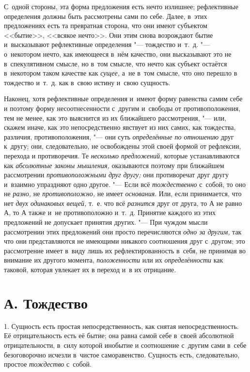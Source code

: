 С~одной стороны, эта форма предложения есть нечто излишнее; рефлективные
определения должны быть рассмотрены сами по себе. Далее, в~этих
предложениях есть та превратная сторона, что они имеют субъектом <<бытие>>,
<<всякое нечто>>. Они этим снова возрождают бытие и~высказывают рефлективные
определения "--- тождество и~т.~д. "--- о~некотором нечто, как имеющееся в~нём
качество, они высказывают это не в~спекулятивном смысле, но в~том смысле,
что нечто как субъект остаётся в~некотором таком качестве как
{\em сущее,} а~не в~том смысле, что оно перешло в
тождество и~т.~д. как в~свою истину и~свою сущность.

Наконец, хотя рефлективные определения и~имеют форму равенства самим себе и
поэтому форму несоотнесенности с~другим и~свободы от противоположения, тем
не менее, как это выяснится из их ближайшего рассмотрения, "--- или, скажем
иначе, как это непосредственно явствует из них самих, как тождества,
различия, противоположения, "--- они суть
{\em определённые по отношению} друг к~другу; они,
следовательно, не освобождены этой своей формой от рефлексии, перехода и
противоречия. Те {\em несколько предложений,} которые
устанавливаются как {\em абсолютные законы мышления,}
оказываются поэтому при ближайшем рассмотрении
{\em противоположными друг другу;} они противоречат
друг другу и~взаимно упраздняют одно другое. "--- Если всё
{\em тождественно} с~собой, то оно не {\em разно,} не
{\em противоположно,} не имеет {\em основания}. Или, если принимается, что нет
{\em двух одинаковых вещей,} т.~е. что всё
{\em разнится} друг от друга, то $А$ не равно
$А$, то $А$ также и~не противоположно и~т.~д. Принятие
каждого из этих предложений не допускает принятия других. "--- При чуждом
мысли рассмотрении этих предложений они просто перечисляются
{\em одно за другим,} так что они представляются не
имеющими никакого соотношения друг с~другом; это рассмотрение имеет в~виду
лишь их рефлектированность в~себя, не принимая во внимание их другого
момента, {\em положенности} или их
{\em определённости} как таковой, которая увлекает их в
переход и~в их отрицание.

\section[А. Тождество]{А. Тождество}
1. Сущность есть простая непосредственность, как
снятая непосредственность. Её отрицательность есть её бытие; она равна
самой себе в~своей абсолютной отрицательности, в~силу которой инобытие и
соотношение с~другим сами в~себе безоговорочно исчезли в~чистое
саморавенство. Сущность есть, следовательно, простое
{\em тождество} с~собой.

